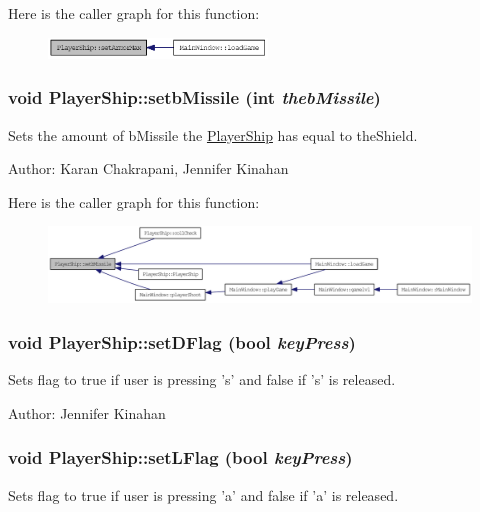 Here is the caller graph for this function:\nopagebreak
\begin{figure}[H]
\begin{center}
\leavevmode
\includegraphics[width=165pt]{class_player_ship_af7378ca18726f28160c2ac30d091c9b8_icgraph}
\end{center}
\end{figure}
\hypertarget{class_player_ship_a83a451bcbd09a63094402ba83e73db2a}{
\subsubsection[{setbMissile}]{\setlength{\rightskip}{0pt plus 5cm}void PlayerShip::setbMissile (int {\em thebMissile})}}
\label{class_player_ship_a83a451bcbd09a63094402ba83e73db2a}
Sets the amount of bMissile the \hyperlink{class_player_ship}{PlayerShip} has equal to theShield.

Author: Karan Chakrapani, Jennifer Kinahan 

Here is the caller graph for this function:\nopagebreak
\begin{figure}[H]
\begin{center}
\leavevmode
\includegraphics[width=408pt]{class_player_ship_a83a451bcbd09a63094402ba83e73db2a_icgraph}
\end{center}
\end{figure}
\hypertarget{class_player_ship_afa576113093b15958d5b64bea60c302a}{
\subsubsection[{setDFlag}]{\setlength{\rightskip}{0pt plus 5cm}void PlayerShip::setDFlag (bool {\em keyPress})}}
\label{class_player_ship_afa576113093b15958d5b64bea60c302a}
Sets flag to true if user is pressing 's' and false if 's' is released.

Author: Jennifer Kinahan \hypertarget{class_player_ship_a52c30b5039d38b1d285fbc65689b377b}{
\subsubsection[{setLFlag}]{\setlength{\rightskip}{0pt plus 5cm}void PlayerShip::setLFlag (bool {\em keyPress})}}
\label{class_player_ship_a52c30b5039d38b1d285fbc65689b377b}
Sets flag to true if user is pressing 'a' and false if 'a' is released.

